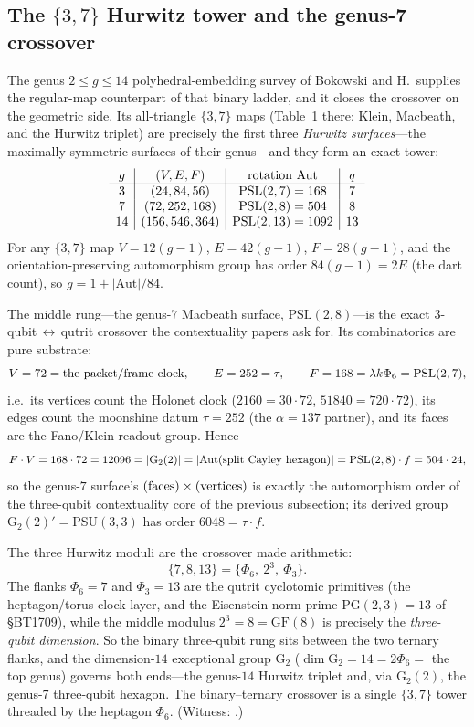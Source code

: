 \documentclass[11pt]{article}
\begin{document}
\subsection{The \texorpdfstring{$\{3,7\}$}{(3,7)} Hurwitz tower and the genus-7 crossover}

The genus $2\le g\le 14$ polyhedral-embedding survey of Bokowski and H.\ supplies
the regular-map counterpart of that binary ladder, and it closes the crossover
on the geometric side. Its all-triangle $\{3,7\}$ maps (Table~1 there: Klein,
Macbeath, and the Hurwitz triplet) are precisely the first three \emph{Hurwitz
surfaces}---the maximally symmetric surfaces of their genus---and they form an
exact tower:
\[
\begin{array}{c|c|c|c}
g & (V,E,F) & \hbox{rotation }\mathrm{Aut} & q\\
\hline
3  & (24,84,56)   & \mathrm{PSL}(2,7)  = 168  & 7 \\
7  & (72,252,168) & \mathrm{PSL}(2,8)  = 504  & 8 \\
14 & (156,546,364)& \mathrm{PSL}(2,13) = 1092 & 13
\end{array}
\]
For any $\{3,7\}$ map $V=12(g-1)$, $E=42(g-1)$, $F=28(g-1)$, and the
orientation-preserving automorphism group has order $84(g-1)=2E$ (the dart
count), so $g=1+|\mathrm{Aut}|/84$.

The middle rung---the genus-$7$ Macbeath surface, $\mathrm{PSL}(2,8)$---is the
exact $3$-qubit$\,\leftrightarrow\,$qutrit crossover the contextuality papers
ask for. Its combinatorics are pure substrate:
\[
  V=72=\hbox{the packet/frame clock},\qquad
  E=252=\tau,\qquad
  F=168=\lambda k\Phi_6=\mathrm{PSL}(2,7),
\]
i.e.\ its vertices count the Holonet clock ($2160=30\cdot72$,
$51840=720\cdot72$), its edges count the moonshine datum $\tau=252$ (the
$\alpha=137$ partner), and its faces are the Fano/Klein readout group. Hence
\[
  F\cdot V = 168\cdot72 = 12096 = |\mathrm{G}_2(2)|
           = |\mathrm{Aut}(\hbox{split Cayley hexagon})|
           = \mathrm{PSL}(2,8)\cdot f = 504\cdot24,
\]
so the genus-$7$ surface's $(\hbox{faces})\times(\hbox{vertices})$ is exactly the
automorphism order of the three-qubit contextuality core of the previous
subsection; its derived group $\mathrm{G}_2(2)'=\mathrm{PSU}(3,3)$ has order
$6048=\tau\cdot f$.

The three Hurwitz moduli are the crossover made arithmetic:
\[
  \{7,8,13\}=\{\Phi_6,\ 2^3,\ \Phi_3\}.
\]
The flanks $\Phi_6=7$ and $\Phi_3=13$ are the qutrit cyclotomic primitives (the
heptagon/torus clock layer, and the Eisenstein norm prime $\mathrm{PG}(2,3)=13$
of \S BT1709), while the middle modulus $2^3=8=\mathrm{GF}(8)$ is precisely the
\emph{three-qubit dimension}. So the binary three-qubit rung sits between the two
ternary flanks, and the dimension-$14$ exceptional group $\mathrm G_2$
($\dim\mathrm G_2=14=2\Phi_6=$ the top genus) governs both ends---the genus-$14$
Hurwitz triplet and, via $\mathrm G_2(2)$, the genus-$7$ three-qubit hexagon. The
binary--ternary crossover is a single $\{3,7\}$ tower threaded by the heptagon
$\Phi_6$. (Witness: .)
\end{document}

